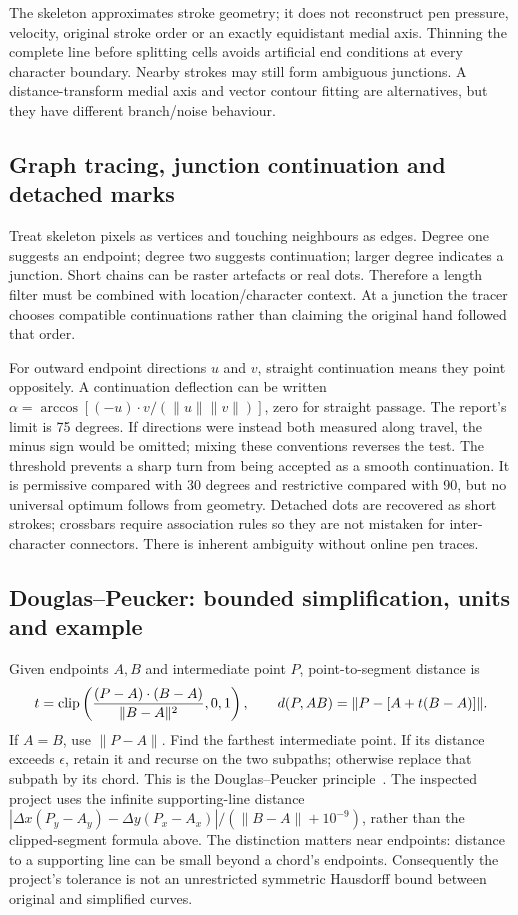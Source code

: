 The skeleton approximates stroke geometry; it does not reconstruct pen
pressure, velocity, original stroke order or an exactly equidistant medial
axis. Thinning the complete line before splitting cells avoids artificial
end conditions at every character boundary. Nearby strokes may still form
ambiguous junctions. A distance-transform medial axis and vector contour
fitting are alternatives, but they have different branch/noise behaviour.

\subsection{Graph tracing, junction continuation and detached marks}
Treat skeleton pixels as vertices and touching neighbours as edges. Degree
one suggests an endpoint; degree two suggests continuation; larger degree
indicates a junction. Short chains can be raster artefacts or real dots.
Therefore a length filter must be combined with location/character context.
At a junction the tracer chooses compatible continuations rather than
claiming the original hand followed that order.

For outward endpoint directions $u$ and $v$, straight continuation means
they point oppositely. A continuation deflection can be written
$\alpha=\arccos[(-u)\cdot v/(\|u\|\|v\|)]$, zero for straight passage.
The report's limit is 75 degrees. If directions were instead both measured
along travel, the minus sign would be omitted; mixing these conventions
reverses the test. The threshold prevents a sharp turn from being accepted
as a smooth continuation. It is permissive compared with 30 degrees and
restrictive compared with 90, but no universal optimum follows from geometry.
Detached dots are recovered as short strokes; crossbars require association
rules so they are not mistaken for inter-character connectors. There is
inherent ambiguity without online pen traces.

\subsection{Douglas--Peucker: bounded simplification, units and example}
Given endpoints $A,B$ and intermediate point $P$, point-to-segment distance is
\[
t=\operatorname{clip}\left({(P-A)\cdot(B-A)\over\|B-A\|^2},0,1\right),
\qquad d(P,AB)=\|P-[A+t(B-A)]\|.
\]
If $A=B$, use $\|P-A\|$. Find the farthest intermediate point. If its
distance exceeds $\epsilon$, retain it and recurse on the two subpaths;
otherwise replace that subpath by its chord. This is the
Douglas--Peucker principle~\cite{douglaspeucker1973,douglaslink}.
The inspected project uses the infinite supporting-line distance
$|\Delta x(P_y-A_y)-\Delta y(P_x-A_x)|/(\|B-A\|+10^{-9})$, rather than
the clipped-segment formula above. The distinction matters near endpoints:
distance to a supporting line can be small beyond a chord's endpoints.
Consequently the project's tolerance is not an unrestricted symmetric
Hausdorff bound between original and simplified curves.

